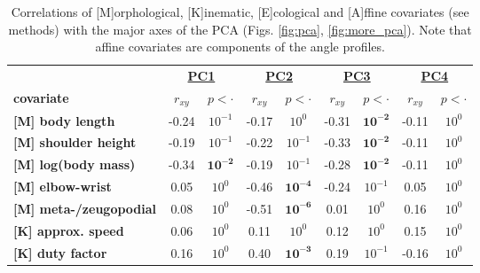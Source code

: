 \begin{table}[p]%
\centering
\caption{ Correlations of [M]orphological, [K]inematic, [E]cological and [A]ffine covariates (see methods) with the major axes of the PCA (Figs. \ref{fig:pca}, \ref*{fig:more_pca}). Note that affine covariates are components of the  angle profiles. }
\begin{tabular}{l @{$\quad$} cc @{$\quad$} cc @{$\quad$} cc @{$\quad$} cc}
\toprule
{} & \multicolumn{2}{c}{\underline{\textbf{PC1}}} & \multicolumn{2}{c}{\underline{\textbf{PC2}}} & \multicolumn{2}{c}{\underline{\textbf{PC3}}} & \multicolumn{2}{c}{\underline{\textbf{PC4}}} \\
{\textbf{covariate}} &                 $r_{xy}$ &              $p <\cdot$ &                 $r_{xy}$ &              $p <\cdot$ &                 $r_{xy}$ &              $p <\cdot$ &                 $r_{xy}$ &              $p <\cdot$ \\
\midrule
\textbf{[M] body length      } &                    -0.24 &  $10^{-1}$ &                    -0.17 &   $10^{0}$ &                    -0.31 &      $\mathbf{10^{-2}}$ &                    -0.11 &   $10^{0}$ \\
\textbf{[M] shoulder height  } &                    -0.19 &  $10^{-1}$ &                    -0.22 &  $10^{-1}$ &                    -0.33 &      $\mathbf{10^{-2}}$ &                    -0.11 &   $10^{0}$ \\
\textbf{[M] log(body mass)   } &                    -0.34 &      $\mathbf{10^{-2}}$ &                    -0.19 &  $10^{-1}$ &                    -0.28 &      $\mathbf{10^{-2}}$ &                    -0.11 &   $10^{0}$ \\
\textbf{[M] elbow-wrist      } &                     0.05 &   $10^{0}$ &                    -0.46 &      $\mathbf{10^{-4}}$ &                    -0.24 &  $10^{-1}$ &                     0.05 &   $10^{0}$ \\
\textbf{[M] meta-/zeugopodial} &                     0.08 &   $10^{0}$ &                    -0.51 &      $\mathbf{10^{-6}}$ &                     0.01 &   $10^{0}$ &                     0.16 &   $10^{0}$ \\
\midrule\textbf{[K] approx. speed    } &                     0.06 &   $10^{0}$ &                     0.11 &   $10^{0}$ &                     0.12 &   $10^{0}$ &                     0.15 &   $10^{0}$ \\
\textbf{[K] duty factor      } &                     0.16 &   $10^{0}$ &                     0.40 &      $\mathbf{10^{-3}}$ &                     0.19 &  $10^{-1}$ &                    -0.16 &   $10^{0}$ \\

\end{tabular}
\end{table}
